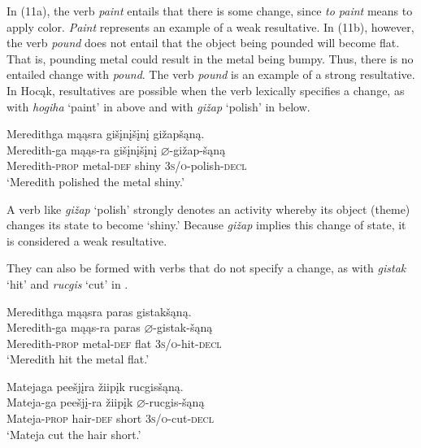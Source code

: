 \documentclass[output=paper]{LSP/langsci}
\begin{document}
\begin{exe}
\ex
\begin{xlist}



\end{xlist}
\end{exe}

In (11a), the verb \textit{paint} entails that there is some change, since \textit{to paint} means to apply color. \textit{Paint} represents an example of a weak resultative. In (11b), however, the verb \textit{pound} does not entail that the object being pounded will become flat. That is, pounding metal could result in the metal being bumpy. Thus, there is no entailed change with \textit{pound}. The verb \textit{pound} is an example of a strong resultative. In Hocąk, resultatives are possible when the verb lexically specifies a change, as with \textit{hogiha} `paint' in  above and with \textit{gižap} `polish' in  below.

\begin{exe}

\ex \glll Meredithga mąąsra gišįnįšįnį gižapšąną.  \\
 Meredith-ga mąąs-ra gišįnįšįnį {$\varnothing$}-gižap-šąną\\
 Meredith-\textsc{prop} metal-\textsc{def} shiny \textsc{3s/o}-polish-\textsc{decl}\\
\glt `Meredith polished the metal shiny.'

\end{exe}

A verb like \textit{gižap} `polish' strongly denotes an activity whereby its object (theme) changes its state to become `shiny.' Because \textit{gižap} implies this change of state, it is considered a weak resultative. 

They can also be formed with verbs that do not specify a change, as with \textit{gistak} `hit' and \textit{rucgis} `cut' in .

\begin{exe}
\ex
\begin{xlist}

\ex \glll Meredithga mąąsra paras gistakšąną. \\
 Meredith-ga mąąs-ra paras {$\varnothing$}-gistak-šąną\\
Meredith-\textsc{prop} metal-\textsc{def} flat \textsc{3s/o}-hit-\textsc{decl}\\
\glt `Meredith hit the metal flat.'

\ex \glll Matejaga peešjįra žiipįk rucgisšąną.\\
Mateja-ga peešjį-ra žiipįk {$\varnothing$}-rucgis-šąną\\
Mateja-\textsc{prop} hair-\textsc{def} short \textsc{3s/o}-cut-\textsc{decl}\\
\glt `Mateja cut the hair short.'

\end{xlist}
\end{exe}
\end{document}

